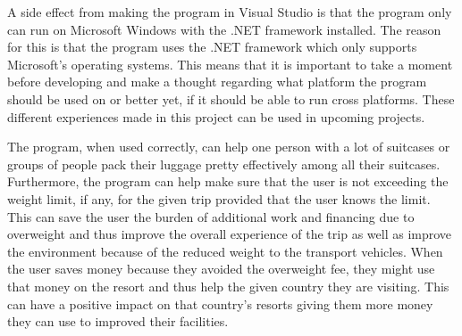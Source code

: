 A side effect from making the program in Visual Studio is that the program only can run on Microsoft Windows with the .NET framework installed. The reason for this is that the program uses the .NET framework which only supports Microsoft's operating systems.
This means that it is important to take a moment before developing and make a thought regarding what platform the program should be used on or better yet, if it should be able to run cross platforms.
These different experiences made in this project can be used in upcoming projects.

The program, when used correctly, can help one person with a lot of suitcases or groups of people pack their luggage pretty effectively among all their suitcases. Furthermore, the program can help make sure that the user is not exceeding the weight limit, if any, for the given trip provided that the user knows the limit. This can save the user the burden of additional work and financing due to overweight and thus improve the overall experience of the trip as well as improve the environment because of the reduced weight to the transport vehicles. When the user saves money because they avoided the overweight fee, they might use that money on the resort and thus help the given country they are visiting. This can have a positive impact on that country's resorts giving them more money they can use to improved their facilities.